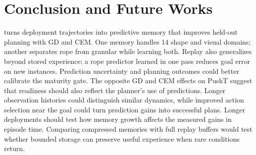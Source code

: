 \section{Conclusion and Future Works}
\label{sec:conclusion}

\ours turns deployment trajectories into predictive memory that improves held-out planning with GD and CEM. One memory handles 14 shape and visual domains; another separates rope from granular while learning both. Replay also generalizes beyond stored experience: a rope predictor learned in one pass reduces goal error on new instances.
%
Prediction uncertainty and planning outcomes could better calibrate the maturity gate. The opposite GD and CEM effects on PushT suggest that readiness should also reflect the planner's use of predictions. Longer observation histories could distinguish similar dynamics, while improved action selection near the goal could turn prediction gains into successful plans. Longer deployments should test how memory growth affects the measured gains in episode time. Comparing compressed memories with full replay buffers would test whether bounded storage can preserve useful experience when rare conditions return.
